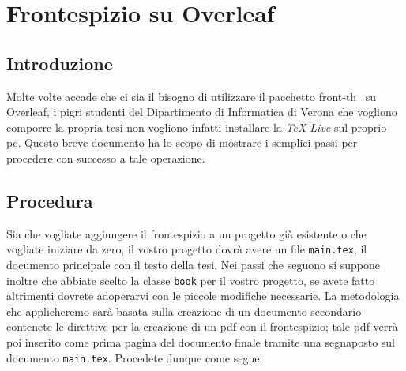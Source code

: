 \documentclass[a4paper,titlepage]{book}
\newcommand{\overleaf}{Overleaf}
\begin{document}
\begin{frontespizio}
\end{frontespizio}

\chapter{Frontespizio su Overleaf}

\section{Introduzione}
Molte volte accade che ci sia il bisogno di utilizzare il pacchetto {\sffamily front-th}~\cite{egreg} su \overleaf{}, i pigri studenti del Dipartimento di Informatica di Verona che vogliono comporre la propria tesi non vogliono infatti installare la \emph{TeX Live} sul proprio pc. Questo breve documento ha lo scopo di mostrare i semplici passi per procedere con successo a tale operazione.

\section{Procedura}

Sia che vogliate aggiungere il frontespizio a un progetto già esistente o che vogliate iniziare da zero, il vostro progetto dovrà avere un file \texttt{main.tex}, il documento principale con il testo della tesi. Nei passi che seguono si suppone inoltre che abbiate scelto la classe \texttt{book} per il vostro progetto, se avete fatto altrimenti dovrete adoperarvi con le piccole modifiche necessarie.
La metodologia che applicheremo sarà basata sulla creazione di un documento secondario contenete le direttive per la creazione di un pdf con il frontespizio; tale pdf verrà poi inserito come prima pagina del documento finale tramite una segnaposto sul documento \texttt{main.tex}. Procedete dunque come segue:
\end{document}
